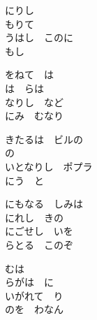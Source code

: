 \documentclass[10pt,b5j]{tarticle} %
\begin{document}
\vspace{1.5em} %
\newcommand{\linespace}{0.5em} %
\newcommand{\blocksize}{0.5\hsize} %
\begin{enumerate} %
    \begin{minipage}[c]{\blocksize}
    
        \vspace{\linespace}
        \item
        にりし　\\
        もりて　\\
        うはし　このに\\
        もし　
        
        \vspace{\linespace}
        \item
        をねて　は\\
        は　らは\\
        なりし　など\\
        にみ　むなり
        
        \vspace{\linespace}
        \item
        きたるは　ビルの\\
        の　　\\
        いとなりし　ポプラ\\
        にう　と
        
        \vspace{\linespace}
        \item
        にもなる　しみは\\
        にれし　きの\\
        にごせし　いを\\
        らとる　このぞ
        
        \vspace{\linespace}
        \item
        むは　\\
        らがは　に\\
        いがれて　り\\
        のを　わなん
    
    \end{minipage}
\end{enumerate} %
\end{document}
